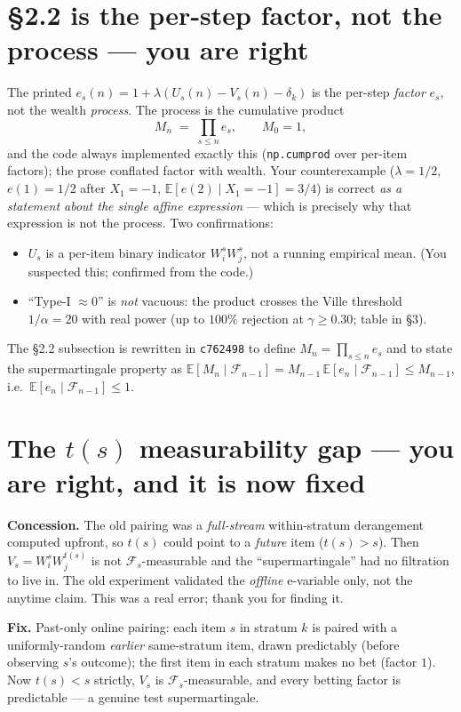 \documentclass[11pt]{article}
\begin{document}
\section{\S2.2 is the per-step factor, not the process --- you are right}
The printed $e_s(n)=1+\lambda(U_s(n)-V_s(n)-\delta_k)$ is the per-step \emph{factor} $e_s$, not the wealth \emph{process}. The process is the cumulative product
\[
  M_n \;=\; \prod_{s\le n} e_s, \qquad M_0 = 1,
\]
and the code always implemented exactly this (\texttt{np.cumprod} over per-item factors); the prose conflated factor with wealth. Your counterexample ($\lambda={1}/{2}$, $e(1)={1}/{2}$ after $X_1=-1$, $\mathbb{E}[e(2)\mid X_1{=}-1]={3}/{4}$) is correct \emph{as a statement about the single affine expression} --- which is precisely why that expression is not the process. Two confirmations:
\begin{itemize}
  \item $U_s$ is a per-item binary indicator $W_i^s W_j^s$, not a running empirical mean. (You suspected this; confirmed from the code.)
  \item ``Type-I $\approx 0$'' is \emph{not} vacuous: the product crosses the Ville threshold $1/\alpha=20$ with real power (up to $100\%$ rejection at $\gamma\ge 0.30$; table in \S3).
\end{itemize}
The \S2.2 subsection is rewritten in \texttt{c762498} to define $M_n=\prod_{s\le n}e_s$ and to state the supermartingale property as $\mathbb{E}[M_n\mid\mathcal{F}_{n-1}]=M_{n-1}\,\mathbb{E}[e_n\mid\mathcal{F}_{n-1}]\le M_{n-1}$, i.e.\ $\mathbb{E}[e_n\mid\mathcal{F}_{n-1}]\le 1$.

\section{The $t(s)$ measurability gap --- you are right, and it is now fixed}
\textbf{Concession.} The old pairing was a \emph{full-stream} within-stratum derangement computed upfront, so $t(s)$ could point to a \emph{future} item ($t(s)>s$). Then $V_s=W_i^s W_j^{t(s)}$ is not $\mathcal{F}_s$-measurable and the ``supermartingale'' had no filtration to live in. The old experiment validated the \emph{offline} e-variable only, not the anytime claim. This was a real error; thank you for finding it.

\textbf{Fix.} Past-only online pairing: each item $s$ in stratum $k$ is paired with a uniformly-random \emph{earlier} same-stratum item, drawn predictably (before observing $s$'s outcome); the first item in each stratum makes no bet (factor $1$). Now $t(s)<s$ strictly, $V_s$ is $\mathcal{F}_s$-measurable, and every betting factor is predictable --- a genuine test supermartingale.
\end{document}
